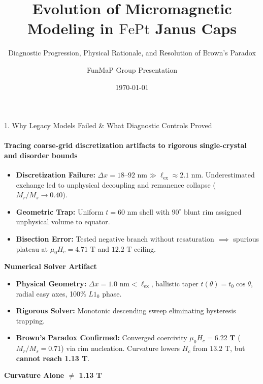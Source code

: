 \documentclass[aspectratio=169, 10pt]{beamer}
\title[FePt Janus Micromagnetics]{Evolution of Micromagnetic Modeling in $\text{FePt}$ Janus Caps}
\subtitle{Diagnostic Progression, Physical Rationale, and Resolution of Brown's Paradox}
\author{FunMaP Group Presentation}
\date{\today}
\begin{document}
\begin{frame}{1. Why Legacy Models Failed \& What Diagnostic Controls Proved}
\framesubtitle{Tracing coarse-grid discretization artifacts to rigorous single-crystal and disorder bounds}

\begin{tcbraster}[raster columns=3, raster equal height, raster column skip=2.5mm]
  \begin{tcolorbox}[colback=cardbg!5!white, colframe=accentred, title=\textbf{Legacy v1 Breakdown}, fonttitle=\scriptsize\bfseries, fontupper=\tiny]
    \begin{itemize}\setlength{\itemsep}{1pt}
      \item \textbf{Discretization Failure:} $\Delta x = 18\text{--}92\text{ nm} \gg \ell_{\mathrm{ex}} \approx 2.1\text{ nm}$. Underestimated exchange led to unphysical decoupling and remanence collapse ($M_r/M_s \to 0.40$).
      \item \textbf{Geometric Trap:} Uniform $t=60\text{ nm}$ shell with $90^\circ$ blunt rim assigned unphysical volume to equator.
      \item \textbf{Bisection Error:} Tested negative branch without resaturation $\implies$ spurious plateau at $\mu_0 H_c = 4.71\text{ T}$ and $12.2\text{ T}$ ceiling.
    \end{itemize}
    \vspace{2pt}
    \centering\textbf{\textcolor{accentred}{Numerical Solver Artifact}}
  \end{tcolorbox}

  \begin{tcolorbox}[colback=cardbg!5!white, colframe=accentblue, title=\textbf{Continuum Benchmark (R1)}, fonttitle=\scriptsize\bfseries, fontupper=\tiny]
    \begin{itemize}\setlength{\itemsep}{1pt}
      \item \textbf{Physical Geometry:} $\Delta x = 1.0\text{ nm} < \ell_{\mathrm{ex}}$, ballistic taper $t(\theta)=t_0\cos\theta$, radial easy axes, 100\% $L1_0$ phase.
      \item \textbf{Rigorous Solver:} Monotonic descending sweep eliminating hysteresis trapping.
      \item \textbf{Brown's Paradox Confirmed:} Converged coercivity $\mu_0 H_c = \mathbf{6.22\text{ T}}$ ($M_r/M_s = 0.71$) via rim nucleation. Curvature lowers $H_c$ from $13.2\text{ T}$, but \textbf{cannot reach 1.13 T}.
    \end{itemize}
    \vspace{2pt}
    \centering\textbf{\textcolor{accentblue}{Curvature Alone $\neq$ 1.13 T}}
  \end{tcolorbox}


\end{tcbraster}
\end{frame}
\end{document}
